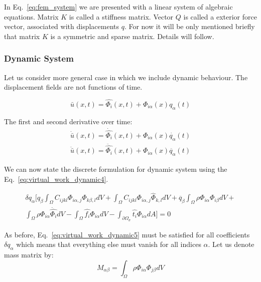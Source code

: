 \documentclass[en]{minipw} %
\begin{document}
In Eq.~\ref{eq:fem_system} we are presented with a linear system of algebraic equations. Matrix $K$ is called a stiffness matrix. Vector $Q$ is called a exterior force vector, associated with displacements $q$. For now it will be only mentioned briefly that matrix $K$ is a symmetric and sparse matrix. Details will follow.

\subsubsection{Dynamic System}
Let us consider more general case in which we include dynamic behaviour. The displacement fields are not functions of time.

\begin{equation}
\bar{u}(x, t) = \hat{\Phi_i}(x, t) + \Phi_{i \alpha}(x)q_{\alpha}(t)
\end{equation}

The first and second derivative over time:
\begin{equation}
\begin{aligned}
\dot{\bar{u}}(x, t) = \dot{\hat{\Phi_i}}(x, t) + \Phi_{i \alpha}(x)\dot{q_{\alpha}}(t)
\\
\ddot{\bar{u}}(x, t) = \ddot{\hat{\Phi_i}}(x, t) + \Phi_{i \alpha}(x)\ddot{q_{\alpha}}(t)
\end{aligned}
\end{equation}

We can now state the discrete formulation for dynamic system using the Eq.~\ref{eq:virtual_work_dynamic4}.

\begin{equation}
\label{eq:virtual_work_dynamic5}
\begin{aligned}
\delta q_{\alpha}[ q_{\beta} \int_{\Omega} C_{ijkl} \Phi_{i \alpha,j} \Phi_{k \beta,l} dV + \int_{\Omega} C_{ijkl} \Phi_{i \alpha,j} \hat{\Phi}_{k,l} dV + \ddot{q_{\beta}} \int_{\Omega}\rho \Phi_{i \alpha} \Phi_{i \beta} dV +
\\ 
\int_{\Omega} \rho \Phi_{i \alpha} \ddot{\hat{\Phi_{i}}} dV - \int_{\Omega} \hat{f_i} \Phi_{i \alpha} dV - \int_{\partial \Omega_{\sigma}} \hat{t_i}\Phi_{i \alpha} dA] = 0
\end{aligned}
\end{equation}

As before, Eq.~\ref{eq:virtual_work_dynamic5} must be satisfied for all coefficients $\delta q_{\alpha}$ which means that everything else must vanish for all indices $\alpha$. Let us denote mass matrix by:
\begin{equation}
\label{eq:mass_matrix1}
M_{\alpha \beta} = \int_{\Omega} \rho \Phi_{i \alpha} \Phi_{j \beta} dV 
\end{equation}
\end{document}
